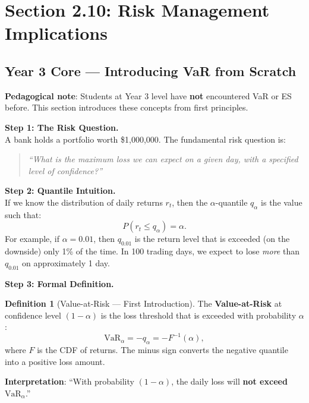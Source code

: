 \documentclass[11pt, a4paper]{article}
\theoremstyle{definition}
\newtheorem{defn}{Definition}
\begin{document}
\section{Section 2.10: Risk Management Implications}

\subsection{Year 3 Core — Introducing VaR from Scratch}

\noindent\textbf{Pedagogical note}: Students at Year 3 level have \textbf{not} encountered VaR or ES before. This section introduces these concepts from first principles.

\vspace{0.3cm}

\noindent\textbf{Step 1: The Risk Question.}\\
A bank holds a portfolio worth \$1{,}000{,}000. The fundamental risk question is:
\begin{quote}
\textit{``What is the maximum loss we can expect on a given day, with a specified level of confidence?''}
\end{quote}

\noindent\textbf{Step 2: Quantile Intuition.}\\
If we know the distribution of daily returns $r_t$, then the $\alpha$-quantile $q_\alpha$ is the value such that:
\[
  P(r_t \leq q_\alpha) = \alpha.
\]
For example, if $\alpha = 0.01$, then $q_{0.01}$ is the return level that is exceeded (on the downside) only 1\% of the time. In 100 trading days, we expect to lose \textit{more} than $q_{0.01}$ on approximately 1 day.

\vspace{0.2cm}

\noindent\textbf{Step 3: Formal Definition.}

\begin{defn}[Value-at-Risk — First Introduction]
The \textbf{Value-at-Risk} at confidence level $(1-\alpha)$ is the loss threshold that is exceeded with probability $\alpha$:
\[
  \text{VaR}_\alpha = -q_\alpha = -F^{-1}(\alpha),
\]
where $F$ is the CDF of returns. The minus sign converts the negative quantile into a positive loss amount.
\end{defn}

\noindent\textbf{Interpretation}: ``With probability $(1-\alpha)$, the daily loss will \textbf{not exceed} $\text{VaR}_\alpha$.''
\end{document}
